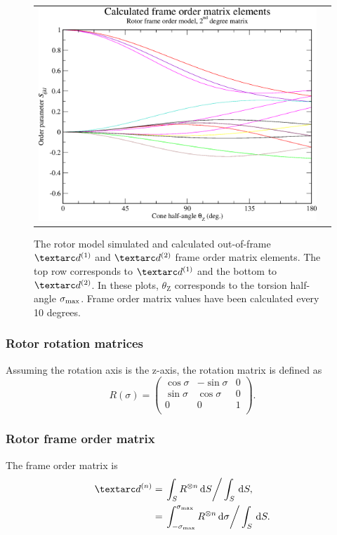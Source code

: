 \begin{figure}
\begin{tabular}{@{}cc@{}}
    \includegraphics[width=.5\textwidth]{images/frame_order_matrix/Sijkl_rotor_out_of_frame_theta_z_calc.eps} \\
  \end{tabular}
  \caption[Rotor simulated and calculated out-of-frame Daeg$^{(1)}$ and Daeg$^{(2)}$ elements.]{
    The rotor model simulated and calculated out-of-frame $\FOone$ and $\FOtwo$ frame order matrix elements.
    The top row corresponds to $\FOone$ and the bottom to $\FOtwo$.
    In these plots, $\theta_\textrm{Z}$ corresponds to the torsion half-angle $\sigma_\textrm{max}$.
    Frame order matrix values have been calculated every 10 degrees.
  }
  \label{fig: simulated and calculated out-of-frame 1st and 2nd degree rotor frame order}
\end{figure}


\subsubsection{Rotor rotation matrices}

Assuming the rotation axis is the z-axis, the rotation matrix is defined as
\begin{equation}\label{eq: R matrix torsion}
    R(\sigma) =
        \begin{pmatrix}
            \cos\sigma & -\sin\sigma & 0 \\
            \sin\sigma & \cos\sigma  & 0 \\
            0          & 0           & 1 \\
        \end{pmatrix}.
\end{equation}

\subsubsection{Rotor frame order matrix}

The frame order matrix is
\begin{subequations}
\begin{align}
    \FOn &= \left. \int_S R^{\otimes n} \diff S \right / \int_S \diff S, \\
         &= \left. \int_{-\conesmax}^{\conesmax} R^{\otimes n} \diff \sigma  \right / \int_S \diff S.
\end{align}
\end{subequations}

